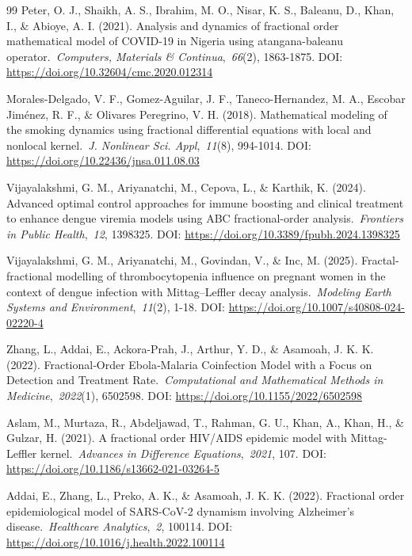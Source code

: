 \documentclass[10pt]{NSP1}
\begin{document}
\begin{thebibliography}{99}
Peter, O. J., Shaikh, A. S., Ibrahim, M. O., Nisar, K. S., Baleanu, D., Khan, I., \& Abioye, A. I. (2021). Analysis and dynamics of fractional order mathematical model of COVID-19 in Nigeria using atangana-baleanu operator.~\emph{Computers, Materials \& Continua},~\emph{66}(2), 1863-1875. DOI: \url{https://doi.org/10.32604/cmc.2020.012314}

Morales-Delgado, V. F., Gomez-Aguilar, J. F., Taneco-Hernandez, M. A., Escobar Jiménez, R. F., \& Olivares Peregrino, V. H. (2018). Mathematical modeling of the smoking dynamics using fractional differential equations with local and nonlocal kernel.~\emph{J. Nonlinear Sci. Appl},~\emph{11}(8), 994-1014. DOI: \url{https://doi.org/10.22436/jnsa.011.08.03}

Vijayalakshmi, G. M., Ariyanatchi, M., Cepova, L., \& Karthik, K. (2024). Advanced optimal control approaches for immune boosting and clinical treatment to enhance dengue viremia models using ABC fractional-order analysis.~\emph{Frontiers in Public Health},~\emph{12}, 1398325. DOI: \url{https://doi.org/10.3389/fpubh.2024.1398325}

Vijayalakshmi, G. M., Ariyanatchi, M., Govindan, V., \& Inc, M. (2025). Fractal-fractional modelling of thrombocytopenia influence on pregnant women in the context of dengue infection with Mittag--Leffler decay analysis.~\emph{Modeling Earth Systems and Environment},~\emph{11}(2), 1-18. DOI: \url{https://doi.org/10.1007/s40808-024-02220-4}

Zhang, L., Addai, E., Ackora-Prah, J., Arthur, Y. D., \& Asamoah, J. K. K. (2022). Fractional‐Order Ebola‐Malaria Coinfection Model with a Focus on Detection and Treatment Rate.~\emph{Computational and Mathematical Methods in Medicine},~\emph{2022}(1), 6502598. DOI: \url{https://doi.org/10.1155/2022/6502598}

Aslam, M., Murtaza, R., Abdeljawad, T., Rahman, G. U., Khan, A., Khan, H., \& Gulzar, H. (2021). A fractional order HIV/AIDS epidemic model with Mittag-Leffler kernel.~\emph{Advances in Difference Equations},~\emph{2021}, 107. DOI: \url{https://doi.org/10.1186/s13662-021-03264-5}

Addai, E., Zhang, L., Preko, A. K., \& Asamoah, J. K. K. (2022). Fractional order epidemiological model of SARS-CoV-2 dynamism involving Alzheimer's disease.~\emph{Healthcare Analytics},~\emph{2}, 100114. DOI: \url{https://doi.org/10.1016/j.health.2022.100114}


\end{thebibliography}
\end{document}
